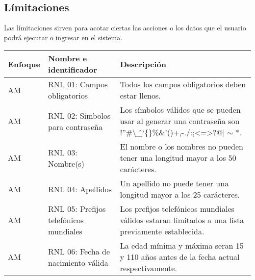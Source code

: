 \subsection{Límitaciones}
Las límitaciones sirven para acotar ciertas las acciones o los datos que el usuario podrá ejecutar o ingresar en el sistema.
  \begin{center}
   \begin{tabular}{|p{1.5cm}|p{4cm}|p{7cm}|}
     \hline
       \textbf{Enfoque}&\textbf{Nombre e identificador} & \textbf{Descripción} \\ \hline
          \label{rnl_01} AM & RNL 01: Campos obligatorios & Todos los campos obligatorios deben estar llenos. \\ \hline
	\label{rnl_02} AM & RNL 02: Símbolos para contraseña & Los símbolos válidos que se pueden usar al generar una contraseña son !''\#\textbackslash\^\_`\{\}\textdollar\%\&'()+,-./:;<=>?@$\mid\sim\ast$. \\ \hline	
	\label{rnl_03} AM & RNL 03: Nombre(s) & El nombre o los nombres no pueden tener una longitud mayor a los 50 carácteres.  \\ \hline	
	\label{rnl_04} AM & RNL 04: Apellidos & Un apellido no puede tener una longitud mayor a los 25 carácteres.  \\ \hline
	\label{rnl_05} AM & RNL 05: Prefijos telefónicos mundiales & Los prefijos telefónicos mundiales válidos estaran limitados a una lista previamente establecida.  \\ \hline
	\label{rnl_06} AM & RNL 06: Fecha de nacimiento válida & La edad mínima y máxima seran 15 y 110 años antes de la fecha actual respectivamente. \\ \hline
   \end{tabular}
       \label{tab:rnl}
 \end{center}
 
